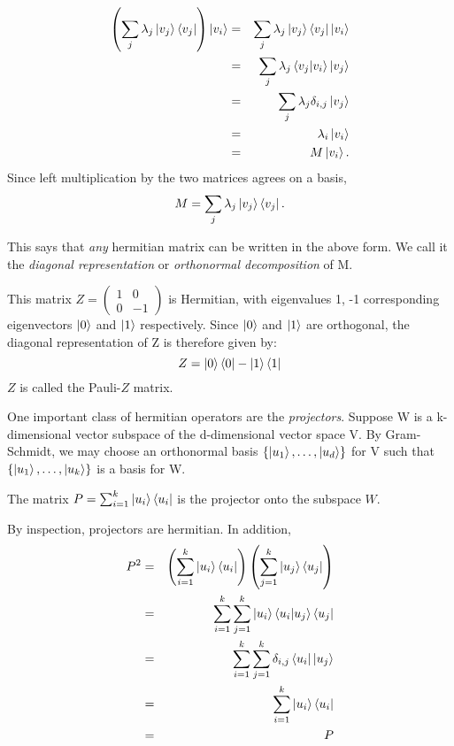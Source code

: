 {\begin{eqnarray}
\left(\sum\limits_j \lambda_j\ket{v_j}\bra{v_j}\right)\ket{v_i}&=&\sum\limits_j \lambda_j\ket{v_j}\bra{v_j}\ket{v_i}\\
&=&\sum\limits_j \lambda_j\braket{v_j|v_i}\ket{v_j}\\
&=&\sum\limits_j \lambda_j\delta_{i,j}\ket{v_j}\\
&=&\lambda_i\ket{v_i}\\
&=&M\ket{v_i}.\\
\end{eqnarray}
Since left multiplication by the two matrices agrees on a basis,
\begin{equation}
M=\sum\limits_j \lambda_j \ket{v_j}\bra{v_j}.    
\end{equation}

This says that {\emph{any}} hermitian matrix can be written in the above form. We call it the \textit{diagonal representation} or \textit{orthonormal decomposition} of M.
\begin{example} \label{example-pauli z diagonal rep}
This matrix $Z=\left(\begin{smallmatrix}
    1 & 0\\
    0 & -1
    \end{smallmatrix}\right)$
    is Hermitian, with eigenvalues 1, -1 corresponding eigenvectors $\ket{0}$ and  $\ket{1}$ respectively.  Since $\ket{0}$ and $\ket{1}$ are orthogonal, the diagonal representation of Z is therefore given by:
\begin{equation}
    Z=\ket{0}\bra{0}-\ket{1}\bra{1}
\end{equation}
$Z$ is called the Pauli-$Z$ matrix.
\end{example}

One important class of hermitian operators are the \textit{projectors}. Suppose W is a k-dimensional vector subspace of the d-dimensional vector space V. By Gram-Schmidt, we may choose an orthonormal basis $\{\ket{u_1}, \hdots, \ket{u_d}\}$ for V such that $\{\ket{u_1}, \hdots, \ket{u_k}\}$ is a basis for W.  
\begin{definition}
The matrix $P=\sum_{i=1}^k \ket{u_i} \bra{u_i}$ is the projector onto the subspace $W$.
\end{definition}
By inspection, projectors are hermitian.  In addition,
\begin{eqnarray}
    P^2&=&\left(\sum_{i=1}^k \ket{u_i} \bra{u_i}\right)\left(\sum_{j=1}^k \ket{u_j} \bra{u_j}\right)\\
    &=&\sum_{i=1}^k \sum_{j=1}^k \ket{u_i} \braket{u_i|u_j} \bra{u_j}\\
    &=&\sum_{i=1}^k \sum_{j=1}^k\delta_{i,j}\bra{u_i}\ket{u_j}\\
    &=&\sum_{i=1}^k \ket{u_i} \bra{u_i}\\
    &=&P
    \end{eqnarray}

}
